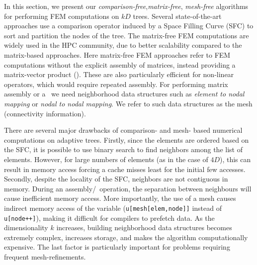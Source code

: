 In this section, we present our \textit{comparison-free},\textit{matrix-free}, \textit{mesh-free} algorithms for performing FEM computations on $kD$ trees. Several state-of-the-art approaches \cite{FernandoDendroGR, Dendro, SundarSampathBiros08, SundarMalhotraBiros13, dealII90, mfem} use a comparison operator induced by a Space Filling Curve (SFC) to sort and partition the nodes of the tree\cite{FernandoSundar16}. The matrix-free FEM computations are widely used in the HPC community\cite{Dendro, mantle, dealII90, mfem}, due to better scalability compared to the matrix-based approaches. Here matrix-free FEM approaches refer to FEM computations without the explicit assembly of matrices,  instead providing a matrix-vector product (\mvec). These are also particularly efficient for non-linear operators, which would require repeated assembly. 
%
For performing matrix assembly or a \mvec\, we need neighborhood data structures such as \textit{element to nodal mapping} or \textit{nodal to nodal mapping}. 
We refer to such data structures %
as the mesh (connectivity information).

There are several major drawbacks of comparison- and mesh- based numerical computations on adaptive trees. 
Firstly, since the elements are ordered based on the SFC, it is possible to use binary search to find neighbors among the list of elements. However, for large numbers of elements (as in the case of $4D$), this can result in memory access forcing a cache misses least for the initial few accesses. Secondly, despite the locality of the SFC, neighbors are not contiguous in memory. During an assembly/\mvec\ operation, the separation between neighbours will cause inefficient memory access. More importantly, the use of a mesh causes indirect memory access of the variable (\texttt{u[mesh[elem,node]]} instead of \texttt{u[node++]}), making it difficult for compilers to prefetch data. 
%
%
As the dimensionality $k$ increases, building neighborhood data structures becomes extremely complex, increases storage, and makes the algorithm computationally expensive. The last factor is particularly important for problems requiring frequent mesh-refinements. 

